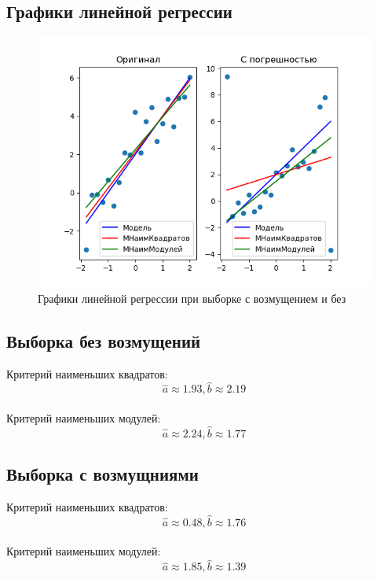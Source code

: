 \documentclass[a4]{article}
\begin{document}
		\subsection{Графики линейной регрессии}
		\begin{figure}[h!]
			\includegraphics[width=\textwidth]{Graph.png} 
			\caption[Графики линейной регрессии при выборке с возмущением и без]{Графики линейной регрессии при выборке с возмущением и без}
		\end{figure}
		
		\subsection{Выборка без возмущений}
		Критерий наименьших квадратов:\\
		$$\hat{a} \approx 1.93,\hat{b} \approx 2.19$$\\
		
		Критерий наименьших модулей:\\
		$$\hat{a} \approx 2.24 ,\hat{b} \approx 1.77$$
		\subsection{Выборка с возмущниями}
		Критерий наименьших квадратов:\\
		$$\hat{a} \approx 0.48,\hat{b} \approx 1.76$$\\
		
		Критерий наименьших модулей:\\
		$$\hat{a} \approx 1.85 ,\hat{b} \approx 1.39$$
\end{document}
